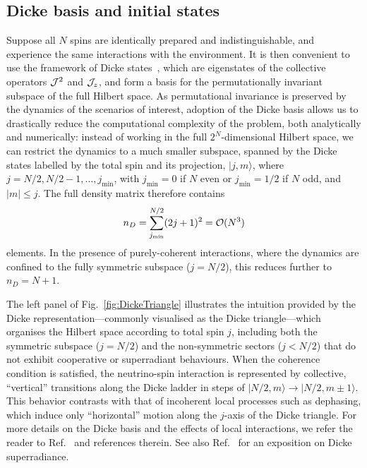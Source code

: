 \documentclass[aps,prd,10pt,twocolumn,superscriptaddress,floatfix,nofootinbib,amsmath,amssymb,altaffilletter,preprintnumbers]{revtex4-1}
\begin{document}

\subsection{Dicke basis and initial states}
\label{sec:dickebasis}

Suppose all $N$ spins are identically prepared and indistinguishable, and experience the same interactions with the environment. It is then convenient to use the framework of Dicke states~\cite{PhysRev.93.99}, which are eigenstates of the collective operators ${\cal J}^2$ and ${\cal J}_z$, and form a basis for the permutationally invariant subspace of the full  Hilbert space.  As permutational invariance is preserved by the dynamics of the scenarios of interest, adoption of the Dicke basis allows us to drastically reduce the computational complexity of the problem, both analytically and numerically: instead of working in the full $2^N$-dimensional Hilbert space, we can restrict the dynamics to a much smaller subspace,
spanned by the Dicke states labelled by the total spin and its projection, $\vert j,m\rangle$, where $j = N/2, N/2 - 1, \ldots, j_{\min}$, with $j_{\min}=0$ if $N$ even or $j_{\min}=1/2$ if $N$ odd, and $\vert m\vert \leq j$. The full density matrix therefore contains 
\begin{equation}
    n_D = \sum_{j_{\rm min}}^{N/2} (2j + 1)^2 = \mathcal{O}(N^3)
\end{equation}
elements. In the presence of purely-coherent interactions, where the dynamics are confined to the fully symmetric subspace (\( j = N/2 \)), this reduces further to $n_D = N + 1$. 


The left panel of Fig.~\ref{fig:DickeTriangle} illustrates the intuition provided by the Dicke representation---commonly visualised as the Dicke triangle---which organises the Hilbert space according to total spin $j$, including both the symmetric subspace ($j=N/2$) and the non-symmetric sectors ($j<N/2$) that do not exhibit cooperative or superradiant behaviours.  When the coherence condition is satisfied, the neutrino-spin interaction is represented by collective, ``vertical'' transitions along the Dicke ladder in steps of $\vert N/2, m\rangle\to\vert N/2, m\pm1\rangle$. This behavior contrasts with that of incoherent local processes such as dephasing, which induce only ``horizontal'' motion along the $j$-axis of the Dicke triangle. For more details on the Dicke basis and the effects of local interactions, we refer the reader to Ref.~\cite{PhysRevA.98.063815} and references therein.  See also Ref.~\cite{Gross:1982dkt,Masson:2021eyk} for an exposition on Dicke superradiance. 
\end{document}
